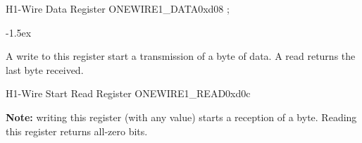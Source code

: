 \documentclass[12pt]{article}
\begin{document}
\begin{register}{H}{1-Wire Data Register ONEWIRE1\_DATA}{0xd08}
%
;
\regnewline%
\end{register}
\begin{regdesc}[0.8\textwidth]\begin{reglist}[000000000]
\itemsep-1.5ex
\item [DATA] A write to this register start a transmission of a byte of data. A read returns the last byte received.
\end{reglist}\end{regdesc}

\begin{register}{H}{1-Wire Start Read Register ONEWIRE1\_READ}{0xd0c}
%
\regnewline%
\end{register}

\textbf{Note:} writing this register (with any value) starts a reception of a byte. Reading this register returns all-zero bits.
\end{document}
